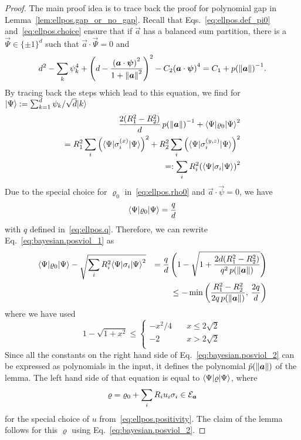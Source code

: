 \begin{proof}
  The main proof idea is to trace back the proof for polynomial gap in Lemma~\ref{lem:ellpos.gap_or_no_gap}.
  Recall that Eqs.~\eqref{eq:ellpos.def_pi0} and~\eqref{eq:ellpos.choice} ensure that if $\vec a$ has a balanced sum partition, there is a $\vec\Psi \in {\{\pm 1\}}^d$ such that $\vec a \cdot \vec\Psi = 0$ and
  \begin{equation}
    d^2 - \sum_k \psi_k^4 + {\left( d - \frac{{({\boldsymbol{a}} \cdot {\boldsymbol{\psi}})}^2}{1 + {\Vert{\boldsymbol{a}}\Vert}^2} \right)}^2 - C_2 {({\boldsymbol{a}} \cdot {\boldsymbol{\psi}})}^4 = C_1 + p{({\Vert{\boldsymbol{a}}\Vert})}^{-1}.
  \end{equation}
  By tracing back the steps which lead to this equation, we find for $\ket{\Psi} := \sum_{k=1}^d \psi_k / \sqrt{d} \ket{k}$
  \begin{align}
    \label{eq:bayesian.posviol_1}
    \frac{2 (R_1^2 - R_2^2)}{d} \, p{(\norm{\vec a})}^{-1} + \bra{\Psi} \varrho_0 \ket{\Psi}^2 \\
    = R_1^2 \sum_i {\left( \bra\Psi \sigma_i^{(x)} \ket\Psi \right)}^2 + R_2^2 \sum_i {\left( \bra\Psi \sigma_i^{(y,z)} \ket\Psi \right)}^2 \\
    =: \sum_i R_i^2 {\left( \bra\Psi \sigma_i \ket\Psi \right)}^2
  \end{align}
  Due to the special choice for $\varrho_0$ in~\eqref{eq:ellpos.rho0} and $\vec a \cdot \vec \psi = 0$, we have
  \begin{equation}
    \bra\Psi\varrho_0\ket\Psi = \frac{q}{d}
  \end{equation}
  with $q$ defined in~\eqref{eq:ellpos.q}.
  Therefore, we can rewrite Eq.~\eqref{eq:bayesian.posviol_1} as
  \begin{align}
    \bra\Psi \varrho_0 \ket\Psi - \sqrt{\sum_i R_i^2 \bra\Psi \sigma_i \ket\Psi^2}
    &&= \frac{q}{d} \left( 1 - \sqrt{1 + \frac{2d (R_1^2 - R_2^2)}{q^2 \, p(\norm{\vec a})}} \right) \nonumber\\
    &&\le - \min \left( \frac{R_1^2 - R_2^2}{2 q \, p(\norm{\vec a})},\, \frac{2q}{d} \right)
    \label{eq:bayesian.posviol_2}
  \end{align}
  where we have used
  \begin{equation}
    1 - \sqrt{1 + x^2} \le
    \left\{
      \begin{array}{ll}
        -x^2 / 4 \quad &  x \le 2 \sqrt{2} \\
       -2 & x > 2 \sqrt{2} \\
      \end{array}
    \right.
  \end{equation}
  Since all the constants on the right hand side of Eq.~\eqref{eq:bayesian.posviol_2} can be expressed as polynomials in the input, it defines the polynomial $\tilde p({\Vert{\boldsymbol{a}}\Vert})$ of the lemma.
  The left hand side of that equation is equal to $\bra\Psi \varrho \ket\Psi$, where
  \begin{equation}
    \varrho = \varrho_0 + \sum_i R_i u_i \sigma_i \in \mathcal{E}_{{\boldsymbol{a}}}
  \end{equation}
  for the special choice of $u$ from~\eqref{eq:ellpos.positivity}.
  The claim of the lemma follows for this $\varrho$ using Eq.~\eqref{eq:bayesian.posviol_2}.
\end{proof}

